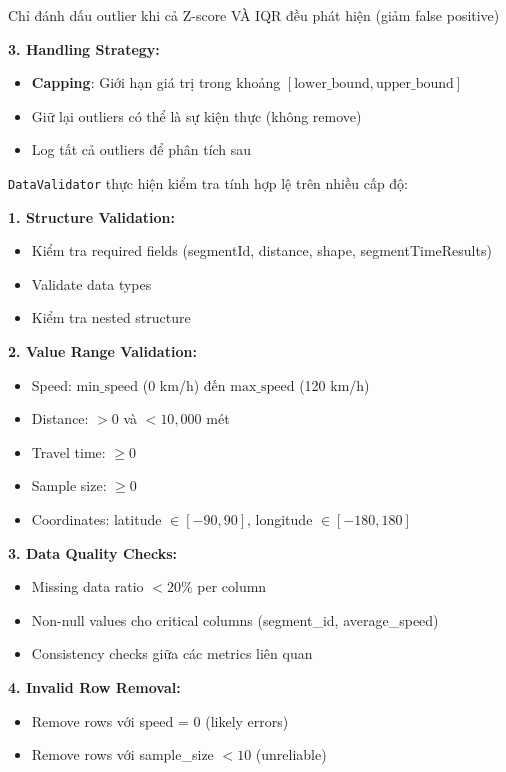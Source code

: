 Chỉ đánh dấu outlier khi cả Z-score VÀ IQR đều phát hiện (giảm false positive)

\textbf{3. Handling Strategy:}
\begin{itemize}
    \item \textbf{Capping}: Giới hạn giá trị trong khoảng $[\text{lower\_bound}, \text{upper\_bound}]$
    \item Giữ lại outliers có thể là sự kiện thực (không remove)
    \item Log tất cả outliers để phân tích sau
\end{itemize}


\texttt{DataValidator} thực hiện kiểm tra tính hợp lệ trên nhiều cấp độ:

\textbf{1. Structure Validation:}
\begin{itemize}
    \item Kiểm tra required fields (segmentId, distance, shape, segmentTimeResults)
    \item Validate data types
    \item Kiểm tra nested structure
\end{itemize}

\textbf{2. Value Range Validation:}
\begin{itemize}
    \item Speed: $\text{min\_speed}$ (0 km/h) đến $\text{max\_speed}$ (120 km/h)
    \item Distance: $> 0$ và $< 10{,}000$ mét
    \item Travel time: $\geq 0$
    \item Sample size: $\geq 0$
    \item Coordinates: latitude $\in [-90, 90]$, longitude $\in [-180, 180]$
\end{itemize}

\textbf{3. Data Quality Checks:}
\begin{itemize}
    \item Missing data ratio $< 20\%$ per column
    \item Non-null values cho critical columns (segment\_id, average\_speed)
    \item Consistency checks giữa các metrics liên quan
\end{itemize}

\textbf{4. Invalid Row Removal:}
\begin{itemize}
    \item Remove rows với speed = 0 (likely errors)
    \item Remove rows với sample\_size $< 10$ (unreliable)
\end{itemize}


